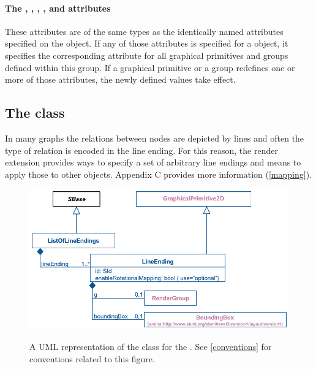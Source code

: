 \paragraph{The \fixttspace{}, \fixttspace{}, \fixttspace{} , \fixttspace{},  \fixttspace{} and\fixttspace{} attributes}

These attributes are of the same types as the identically named attributes specified on the \Text object.   If any of those attributes is specified for a \RenderGroup object, it 
specifies the corresponding attribute for all graphical primitives and groups 
defined within this group. If a graphical primitive or a group redefines one or 
more of those attributes, the newly defined values take effect.

\subsection{The  class}
\label{lineending-class}

In many graphs the relations between nodes are depicted by lines and often the 
type of relation is encoded in the line ending. For this reason, the render
extension provides ways to specify a set of arbitrary line endings and means to
apply those to other objects. Appendix C provides more information (\ref{mapping}).

\begin{figure}[h!]
  \centering
  \includegraphics{images/render-line-endings-uml}\\
  \caption{A UML representation of the \LineEnding class for the \RenderPackage.  See \ref{conventions} for conventions related to this figure. }
  \label{fig:line_ending_render_uml}
\end{figure}


